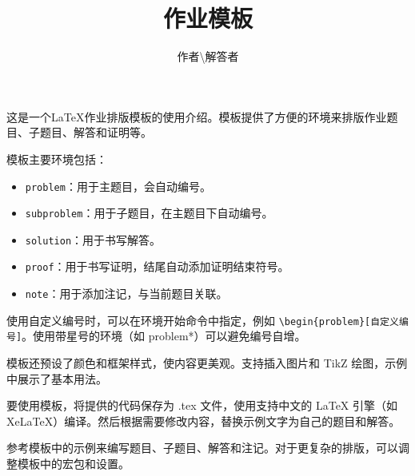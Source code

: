 \documentclass[10pt, a4paper, oneside]{ctexart}
\title{\textbf{作业模板}}
\author{作者\textbackslash 解答者}
\date{}
\newenvironment{framedshaded}[2]
  {\def\FrameCommand{\setlength{\FrameRule}{1pt}\fboxsep=\FrameSep \fcolorbox{#1}{#2}} \MakeFramed {\FrameRestore}}
  {\endMakeFramed}
\newcounter{problemname}
\newcounter{subproblemname}
\newenvironment{problem} [1][\arabic{problemname}]
  {\begin{framedshaded}{framecolor1}{shadecolor1}\stepcounter{problemname}\par\noindent\textbf{#1. }}
  {\end{framedshaded}\par\setcounter{subproblemname}{0}}
\begin{document}
\maketitle
\vspace*{-1.0cm}

这是一个LaTeX作业排版模板的使用介绍。模板提供了方便的环境来排版作业题目、子题目、解答和证明等。

模板主要环境包括：
\begin{itemize}
  \item \verb|problem|：用于主题目，会自动编号。
  \item \verb|subproblem|：用于子题目，在主题目下自动编号。
  \item \verb|solution|：用于书写解答。
  \item \verb|proof|：用于书写证明，结尾自动添加证明结束符号。
  \item \verb|note|：用于添加注记，与当前题目关联。
\end{itemize}
使用自定义编号时，可以在环境开始命令中指定，例如 \verb|\begin{problem}[自定义编号]|。使用带星号的环境（如 problem*）可以避免编号自增。

模板还预设了颜色和框架样式，使内容更美观。支持插入图片和 TikZ 绘图，示例中展示了基本用法。

要使用模板，将提供的代码保存为 .tex 文件，使用支持中文的 LaTeX 引擎（如 XeLaTeX）编译。然后根据需要修改内容，替换示例文字为自己的题目和解答。

参考模板中的示例来编写题目、子题目、解答和注记。对于更复杂的排版，可以调整模板中的宏包和设置。
\end{document}
